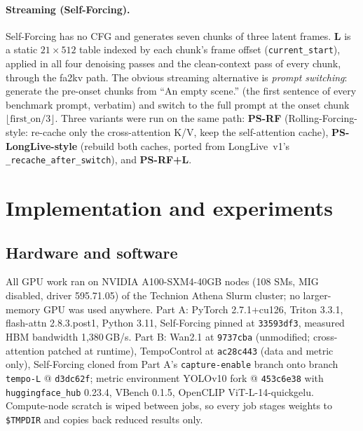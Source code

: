 \documentclass[10pt,a4paper]{article}
\newcommand{\arm}[1]{\textbf{#1}}
\begin{document}
\paragraph{Streaming (Self-Forcing).} Self-Forcing has no CFG and generates seven chunks of three latent frames. \arm{L} is a static $21\times512$ table indexed by each chunk's frame offset (\texttt{current\_start}), applied in all four denoising passes and the clean-context pass of every chunk, through the fa2kv path. The obvious streaming alternative is \emph{prompt switching}: generate the pre-onset chunks from ``An empty scene.'' (the first sentence of every benchmark prompt, verbatim) and switch to the full prompt at the onset chunk $\lfloor\text{first\_on}/3\rfloor$. Three variants were run on the same path: \arm{PS-RF} (Rolling-Forcing-style: re-cache only the cross-attention K/V, keep the self-attention cache), \arm{PS-LongLive-style} (rebuild both caches, ported from LongLive~v1's \texttt{\_recache\_after\_switch}), and \arm{PS-RF+L}.

\section{Implementation and experiments}

\subsection{Hardware and software}
All GPU work ran on NVIDIA A100-SXM4-40GB nodes (108 SMs, MIG disabled, driver 595.71.05) of the Technion Athena Slurm cluster; no larger-memory GPU was used anywhere. Part A: PyTorch 2.7.1+cu126, Triton 3.3.1, flash-attn 2.8.3.post1, Python 3.11, Self-Forcing pinned at \texttt{33593df3}, measured HBM bandwidth 1{,}380\,GB/s. Part B: Wan2.1 at \texttt{9737cba} (unmodified; cross-attention patched at runtime), TempoControl at \texttt{ac28c443} (data and metric only), Self-Forcing cloned from Part A's \texttt{capture-enable} branch onto branch \texttt{tempo-L} @ \texttt{d3dc62f}; metric environment YOLOv10 fork @ \texttt{453c6e38} with \texttt{huggingface\_hub} 0.23.4, VBench 0.1.5, OpenCLIP ViT-L-14-quickgelu. Compute-node scratch is wiped between jobs, so every job stages weights to \texttt{\$TMPDIR} and copies back reduced results only.
\end{document}
